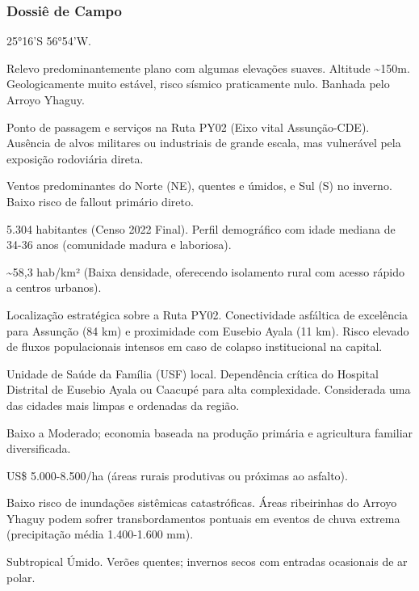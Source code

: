 \subsubsection{Dossiê de Campo}
\begin{description}[style=nextline,leftmargin=0.5cm,font=\bfseries]
\item[Coordenadas]  25°16'S 56°54'W.
\item[Topografia]  Relevo predominantemente plano com algumas elevações suaves. Altitude \textasciitilde 150m. Geologicamente muito estável, risco sísmico praticamente nulo. Banhada pelo Arroyo Yhaguy.
\item[Alvos Estratégicos]  Ponto de passagem e serviços na Ruta PY02 (Eixo vital Assunção-CDE). Ausência de alvos militares ou industriais de grande escala, mas vulnerável pela exposição rodoviária direta.
\item[Fallout]  Ventos predominantes do Norte (NE), quentes e úmidos, e Sul (S) no inverno. Baixo risco de fallout primário direto.
\item[População]  5.304 habitantes (Censo 2022 Final). Perfil demográfico com idade mediana de 34-36 anos (comunidade madura e laboriosa).
\item[Densidade]  \textasciitilde 58,3 hab/\allowbreak km² (Baixa densidade, oferecendo isolamento rural com acesso rápido a centros urbanos).
\item[Vias de Acesso]  Localização estratégica sobre a Ruta PY02. Conectividade asfáltica de excelência para Assunção (84 km) e proximidade com Eusebio Ayala (11 km). Risco elevado de fluxos populacionais intensos em caso de colapso institucional na capital.
\item[Serviços]  Unidade de Saúde da Família (USF) local. Dependência crítica do Hospital Distrital de Eusebio Ayala ou Caacupé para alta complexidade. Considerada uma das cidades mais limpas e ordenadas da região.
\item[Custo de Vida]  Baixo a Moderado; economia baseada na produção primária e agricultura familiar diversificada.
\item[Preço da Terra]  US\$ 5.000-8.500/\allowbreak ha (áreas rurais produtivas ou próximas ao asfalto).
\item[Hidrologia]  Baixo risco de inundações sistêmicas catastróficas. Áreas ribeirinhas do Arroyo Yhaguy podem sofrer transbordamentos pontuais em eventos de chuva extrema (precipitação média 1.400-1.600 mm).
\item[Clima]  Subtropical Úmido. Verões quentes; invernos secos com entradas ocasionais de ar polar.

\end{description}
